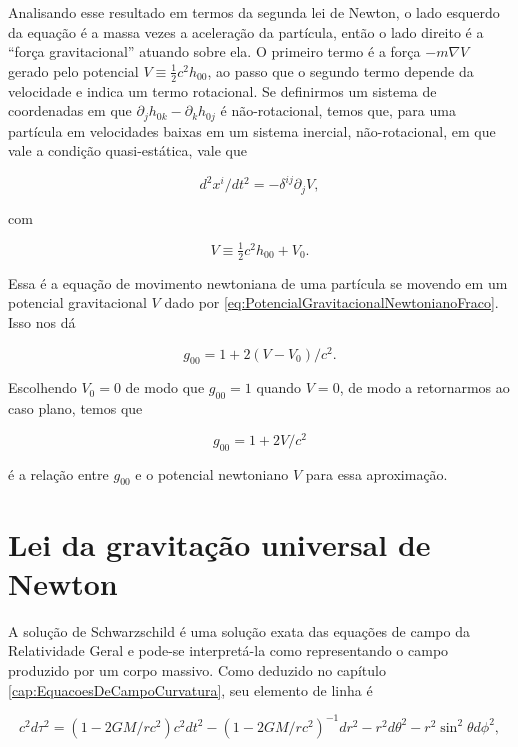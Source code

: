 Analisando esse resultado em termos da segunda lei de Newton, o lado esquerdo da equação é a massa vezes a aceleração da partícula, então o lado direito é a ``força gravitacional'' atuando sobre ela. O primeiro termo é a força $ -m \nabla V $ gerado pelo potencial $ V \equiv \tfrac{1}{2} c^{2} h_{00} $, ao passo que o segundo termo depende da velocidade e indica um termo rotacional. Se definirmos um sistema de coordenadas em que $ \partial_{j} h_{0 k}-\partial_{k} h_{0 j} $ é não-rotacional, temos que, para uma partícula em velocidades baixas em um sistema inercial, não-rotacional, em que vale a condição quasi-estática, vale que

\begin{equation}\label{eq:EquacaoMovimentoPotencial}
d^{2} x^{i} / d t^{2}=-\delta^{i j} \partial_{j} V,
\end{equation}

com

\begin{equation}\label{eq:PotencialGravitacionalNewtonianoFraco}
V \equiv \tfrac{1}{2} c^{2} h_{00}+V_0.
\end{equation}

Essa é a equação de movimento newtoniana de uma partícula se movendo em um potencial gravitacional $ V $ dado por \ref{eq:PotencialGravitacionalNewtonianoFraco}. Isso nos dá

\[
g_{00}=1+ 2(V-V_0) / c^{2}.
\]

Escolhendo $ V_0=0 $ de modo que $ g_{00} = 1 $ quando $ V=0 $, de modo a retornarmos ao caso plano, temos que

\begin{equation}\label{eq:RelacaoG00Potencial}
\boxed{
g_{00}=1+2 V / c^{2}}
\end{equation}

é a relação entre $ g_{00} $ e o potencial newtoniano $ V $ para essa aproximação.

\section{Lei da gravitação universal de Newton}\label{sec:GravitacaoNewton}

A solução de Schwarzschild é uma solução exata das equações de campo da Relatividade Geral e pode-se interpretá-la como representando o campo produzido por um corpo massivo. Como deduzido no capítulo \ref{cap:EquacoesDeCampoCurvatura}, seu elemento de linha é

\[c^{2} d \tau^{2}=\left(1-2 G M / r c^{2}\right) c^{2} d t^{2}-\left(1-2 G M / r c^{2}\right)^{-1} d r^{2}-r^{2} d \theta^{2}-r^{2} \sin ^{2} \theta d \phi^{2},\]

